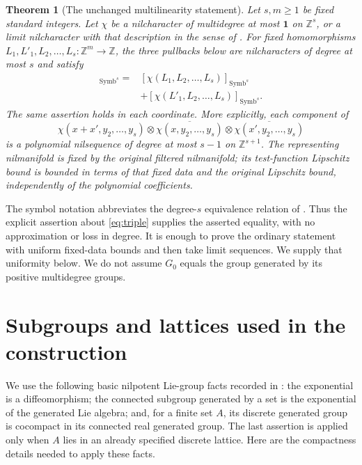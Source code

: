 \documentclass[11pt]{article}
\newtheorem{theorem}{Theorem}
\newcommand{\Z}{\mathbb Z}
\newcommand{\one}{\mathbf 1}
\newcommand{\Symb}{\operatorname{Symb}}
\begin{document}
\begin{theorem}[The unchanged multilinearity statement]\label{thm:main}
Let $s,m\geq1$ be fixed standard integers. Let $\chi$ be a nilcharacter of
multidegree at most $\one$ on $\Z^s$, or a limit nilcharacter with that
description in the sense of \cite[Sections 5--6]{GTZ}. For fixed homomorphisms
$L_1,L'_1,L_2,\ldots,L_s:\Z^m\longrightarrow\Z$, the three pullbacks below
are nilcharacters of degree at most $s$ and satisfy
\begin{align*}
 [\chi(L_1+L'_1,L_2,\ldots,L_s)]_{\Symb^s}
 ={}&[\chi(L_1,L_2,\ldots,L_s)]_{\Symb^s}\\
 &+[\chi(L'_1,L_2,\ldots,L_s)]_{\Symb^s}.
\end{align*}
The same assertion holds in each coordinate. More explicitly, each component
of
\begin{equation}\label{eq:triple}
 \chi(x+x',y_2,\ldots,y_s)\otimes
 \overline{\chi(x,y_2,\ldots,y_s)}\otimes
 \overline{\chi(x',y_2,\ldots,y_s)}
\end{equation}
is a polynomial nilsequence of degree at most $s-1$ on $\Z^{s+1}$.
The representing nilmanifold is fixed by the original filtered nilmanifold;
its test-function Lipschitz bound is bounded in terms of that fixed data and
the original Lipschitz bound, independently of the polynomial coefficients.
\end{theorem}

The symbol notation abbreviates the degree-$s$ equivalence relation of
\cite[Definitions 6.6 and 6.22]{GTZ}. Thus the explicit assertion about
\eqref{eq:triple} supplies the asserted equality, with no approximation or
loss in degree. It is enough to prove the ordinary statement with uniform
fixed-data bounds and then take limit sequences. We supply that uniformity
below. We do not assume $G_0$ equals the group generated by its positive
multidegree groups.

\section{Subgroups and lattices used in the construction}

We use the following basic nilpotent Lie-group facts recorded in
\cite[Section 3, pp.~1242--1243]{GTZ}: the exponential is a diffeomorphism;
the connected subgroup generated by a set is the exponential of the generated
Lie algebra; and, for a finite set $A$, its discrete generated group is
cocompact in its connected real generated group. The last assertion is applied
only when $A$ lies in an already specified discrete lattice. Here are the
compactness details needed to apply these facts.
\end{document}
